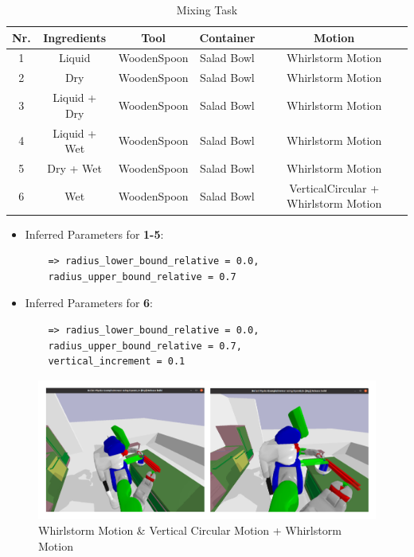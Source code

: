 \begin{table}[H]
    \centering
    \begin{tabular}{|c|c|c|c|c|}
      \hline
      \textbf{Nr.} & \textbf{Ingredients} & \textbf{Tool} & \textbf{Container} & \textbf{Motion}  \\
      \hline
      1 & Liquid & WoodenSpoon & Salad Bowl & Whirlstorm Motion \\
      \hline
      2 & Dry & WoodenSpoon & Salad Bowl & Whirlstorm Motion \\
      \hline
      3 & Liquid + Dry & WoodenSpoon & Salad Bowl & Whirlstorm Motion \\
      \hline
      4 & Liquid + Wet & WoodenSpoon & Salad Bowl & Whirlstorm Motion \\
      \hline
      5 & Dry + Wet & WoodenSpoon & Salad Bowl & Whirlstorm Motion \\
      \hline
      6 & Wet & WoodenSpoon & Salad Bowl & VerticalCircular + Whirlstorm Motion \\
      \hline
    \end{tabular}
    \caption{Mixing Task}
    \label{tab:mixingtask}
  \end{table}

\begin{itemize}
  \item Inferred Parameters for \textbf{1-5}: 
   \begin{lstlisting}
    => radius_lower_bound_relative = 0.0, 
    radius_upper_bound_relative = 0.7
  \end{lstlisting}
  \item Inferred Parameters for \textbf{6}:
  \begin{lstlisting}
    => radius_lower_bound_relative = 0.0, 
    radius_upper_bound_relative = 0.7,
    vertical_increment = 0.1
  \end{lstlisting}
\end{itemize}

\begin{figure}[H]
  \includegraphics[scale=0.26]{Graphics/mixingtask_rahmen.jpg}
  \caption{Whirlstorm Motion \& Vertical Circular Motion + Whirlstorm Motion}
  \label{fig:mixingverb WikiHow}
\end{figure}

